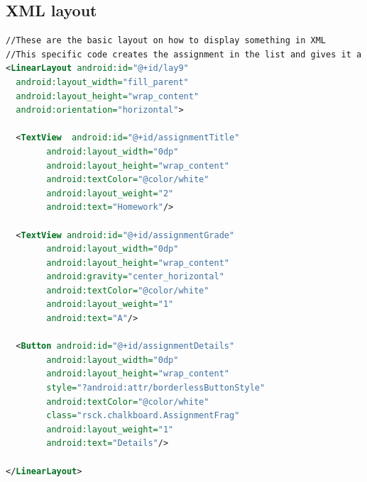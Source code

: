 \documentclass[a4paper]{article} %
\begin{document}
\subsection{XML layout}
\begin{lstlisting}[language=XML] 
//These are the basic layout on how to display something in XML
//This specific code creates the assignment in the list and gives it a button
<LinearLayout android:id="@+id/lay9"
  android:layout_width="fill_parent"
  android:layout_height="wrap_content"
  android:orientation="horizontal">

  <TextView  android:id="@+id/assignmentTitle"
        android:layout_width="0dp"
        android:layout_height="wrap_content"
        android:textColor="@color/white"
        android:layout_weight="2"
        android:text="Homework"/>

  <TextView android:id="@+id/assignmentGrade"
        android:layout_width="0dp"
        android:layout_height="wrap_content"
        android:gravity="center_horizontal"
        android:textColor="@color/white"
        android:layout_weight="1"
        android:text="A"/>

  <Button android:id="@+id/assignmentDetails"
        android:layout_width="0dp"
        android:layout_height="wrap_content"
        style="?android:attr/borderlessButtonStyle"
        android:textColor="@color/white"
        class="rsck.chalkboard.AssignmentFrag"
        android:layout_weight="1"
        android:text="Details"/>

</LinearLayout>
\end{lstlisting}
\end{document}
